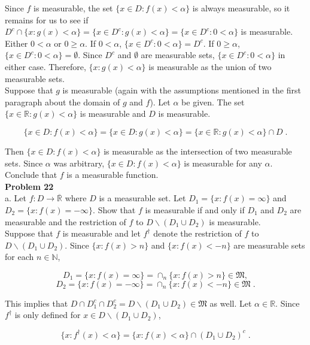 \documentclass[a4paper]{article}
\begin{document}
Since $f$ is measurable, the set $\{x \in D : f(x) < \alpha\}$ is always measurable, so it remains for us to see if $D^c \cap \{x : g(x) < \alpha\} = \{x  \in D^c : g(x) < \alpha\} = \{x \in D^c : 0< \alpha\}$ is measurable. Either $0 < \alpha$ or $0\geq \alpha$. If $0 < \alpha$, $\{x \in D^c : 0<\alpha\} = D^c$. If $0 \geq \alpha$, $\{x \in D^c : 0 < \alpha\} = \emptyset$. Since $D^c$ and $\emptyset$ are measurable sets, $\{x \in D^c : 0 < \alpha\}$ in either case. Therefore, $\{x : g(x) < \alpha\}$ is measurable as the union of two measurable sets. \\

Suppose that $g$ is measurable (again with the assumptions mentioned in the first paragraph about the domain of $g$ and $f$). Let $\alpha$ be given. The set $\{x \in \mathbb{R} : g(x) < \alpha\}$ is measurable and $D$ is measurable.

$$\{x \in D : f(x) < \alpha\} = \{x \in D : g(x) < \alpha\} = \{x \in \mathbb{R} : g(x) < \alpha\} \cap D \;.$$

Then $\{x \in D: f(x) < \alpha\}$ is measurable as the intersection of two measurable sets. Since $\alpha$ was arbitrary, $\{x \in D : f(x) < \alpha\}$ is measurable for any $\alpha$. Conclude that $f$ is a measurable function. \\

{\bf Problem 22}\\

a. Let $f : D \rightarrow \overline{\mathbb{R}}$ where $D$ is a measurable set. Let $D_1 = \{x : f(x) = \infty\}$ and $D_2 = \{x : f(x) = -\infty\}$. Show that $f$ is measurable if and only if $D_1$ and $D_2$ are measurable and the restriction of $f$ to $D \backslash (D_1 \cup D_2)$ is measurable. \\

Suppose that $f$ is measurable and let $f^\dagger$ denote the restriction of $f$ to $D \backslash (D_1 \cup D_2)$. Since $\{x : f(x) > n\}$ and $\{x : f(x) < -n\}$ are measurable sets for each $n \in \mathbb{N}$,

$$D_1 = \{x : f(x) = \infty\} = \cap_n \{x : f(x) > n\} \in \mathfrak{M},$$
$$D_2 = \{x : f(x) = -\infty\} = \cap_n \{x : f(x) < -n \} \in \mathfrak{M} \;.$$

This implies that $D\cap D_1^c\cap D_2^c = D \backslash (D_1\cup D_2)\in \mathfrak{M}$ as well. Let $\alpha \in \mathbb{R}$. Since $f^\dagger$ is only defined for $x \in D\backslash (D_1 \cup D_2)$,

$$\{x: f^\dagger(x) < \alpha\} = \{x: f(x) < \alpha\} \cap (D_1\cup D_2)^c \;.$$
\end{document}
